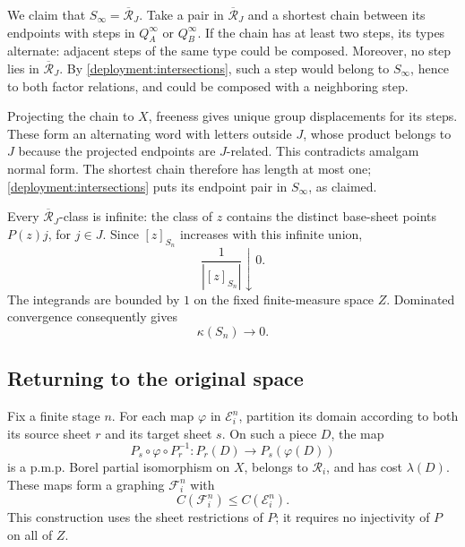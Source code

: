 We claim that \(S_\infty=\overline{\mathcal R}_J\).  Take a pair in
\(\overline{\mathcal R}_J\) and a shortest chain between its endpoints
with steps in \(Q_A^\infty\) or \(Q_B^\infty\).  If the chain has at
least two steps, its types alternate: adjacent steps of the same type
could be composed.  Moreover, no step lies in
\(\overline{\mathcal R}_J\).  By
\eqref{deployment:intersections}, such a step would belong to
\(S_\infty\), hence to both factor relations, and could be composed
with a neighboring step.

Projecting the chain to \(X\), freeness gives unique group
displacements for its steps.  These form an alternating word with
letters outside \(J\), whose product belongs to \(J\) because the
projected endpoints are \(J\)-related.  This contradicts amalgam
normal form.  The shortest chain therefore has length at most one;
\eqref{deployment:intersections} puts its endpoint pair in
\(S_\infty\), as claimed.

Every \(\overline{\mathcal R}_J\)-class is infinite: the class of
\(z\) contains the distinct base-sheet points \(P(z)j\), for
\(j\in J\).  Since \([z]_{S_n}\) increases with this infinite union,
\[
 \frac{1}{|[z]_{S_n}|}\downarrow0.
\]
The integrands are bounded by \(1\) on the fixed finite-measure space
\(Z\).  Dominated convergence consequently gives
\begin{equation}
\label{deployment:kappa-limit}
 \kappa(S_n)\longrightarrow0.
\end{equation}

\subsection{Returning to the original space}
\label{deployment:projection}

Fix a finite stage \(n\).  For each map \(\varphi\) in
\(\mathcal E_i^n\), partition its domain according to both its source
sheet \(r\) and its target sheet \(s\).  On such a piece \(D\), the
map
\[
 P_s\circ\varphi\circ P_r^{-1}:
 P_r(D)\longrightarrow P_s(\varphi(D))
\]
is a p.m.p. Borel partial isomorphism on \(X\), belongs to
\(\mathcal R_i\), and has cost \(\lambda(D)\).  These maps form a
graphing \(\mathcal F_i^n\) with
\begin{equation}
\label{deployment:projection-cost}
 C(\mathcal F_i^n)\leq C(\mathcal E_i^n).
\end{equation}
This construction uses the sheet restrictions of \(P\); it requires
no injectivity of \(P\) on all of \(Z\).

